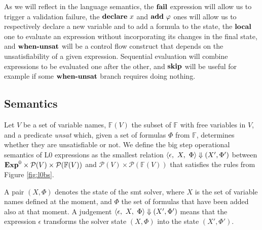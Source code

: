 As we will reflect in the language semantics, the $\textbf{fail}$ expression will allow
us to trigger a validation failure, the $\textbf{declare}~x$ and $\textbf{add}~\varphi$ ones
will allow us to respectively declare a new variable and to add a formula to the
state, the $\textbf{local}$ one to evaluate an expression without incorporating its
changes in the final state, and $\textbf{when-unsat}$ will be a control flow construct
that depends on the unsatisfiability of a given expression.  Sequential
evaluation will combine expressions to be evaluated one after the other, and
$\textbf{skip}$ will be useful for example if some $\textbf{when-unsat}$ branch requires doing
nothing. 

\subsection{Semantics}

Let $V$ be a set of variable names, $\mathbb{F}(V)$ the subset of $\mathbb{F}$ 
with free variables in $V$, and a predicate \textit{unsat} which, given a set of
formulas $\Phi$ from $\mathbb{F}$, determines whether they are unsatisfiable or
not.  We define the big step operational semantics of L0 expressions as the
smallest relation $\langle \epsilon,~X,~\Phi\rangle \Downarrow (X', \Phi')$ between $\mathbf{Exp}^{0} \times
\mathcal{P}(V) \times \mathcal{P}({\mathbb{F}(V)})$ and $\mathcal{P}(V) \times
\mathcal{P}({\mathbb{F}(V)})$ that satisfies the rules from Figure
\ref{fig:l0bs}.

A pair $(X, \Phi)$ denotes the state of the \acrshort{smt} solver, where $X$ is 
the set of variable names defined at the moment, and $\Phi$ the set of formulas
that have been added also at that moment. A judgement
$\langle \epsilon,~X,~\Phi\rangle \Downarrow (X', \Phi')$ means that the expression $\epsilon$
transforms the solver state $(X, \Phi)$ into the state $(X', \Phi')$. 

